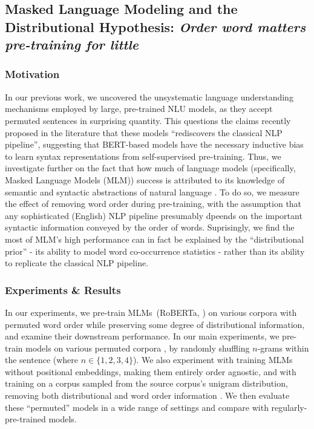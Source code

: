 \documentclass[12pt]{article}
\begin{document}
\subsection{Masked Language Modeling and the Distributional Hypothesis: \textit{Order word matters pre-training for little}}

\subsubsection{Motivation}

In our previous work, we uncovered the unsystematic language understanding mechanisms employed by large, pre-trained NLU models, as they accept permuted sentences in surprising quantity. This questions the claims recently proposed in the literature that these models ``rediscovers the classical NLP pipeline'', suggesting that BERT-based models have the necessary inductive bias to learn syntax representations from self-supervised pre-training. Thus, we investigate further on the fact that how much of language models (specifically, Masked Language Models (MLM)) success is attributed to its knowledge of semantic and syntactic abstractions of natural language \cite{sinha2021a}. To do so, we measure the effect of removing word order during pre-training, with the assumption that any sophisticated (English) NLP pipeline presumably dpeends on the important syntactic information conveyed by the order of words. Suprisingly, we find the most of MLM's high performance can in fact be explained by the ``distributional prior'' - its ability to model word co-occurrence statistics - rather than its ability to replicate the classical NLP pipeline.

\subsubsection{Experiments \& Results}

In our experiments, we pre-train MLMs~(RoBERTa, \citealt{liu2019b}) on various corpora with permuted word order while preserving some degree of distributional information, and examine their downstream performance.
In our main experiments, we pre-train models on various permuted corpora , by randomly shuffling $n$-grams within the sentence (where $n \in \{1,2,3,4\}$).
We also experiment with training MLMs without positional embeddings, making them entirely order agnostic,
and with training on a corpus sampled from the source corpus's %
unigram distribution, removing both distributional and word order information
. We then evaluate these ``permuted'' models in a wide range of settings and compare with regularly-pre-trained models.
\end{document}
